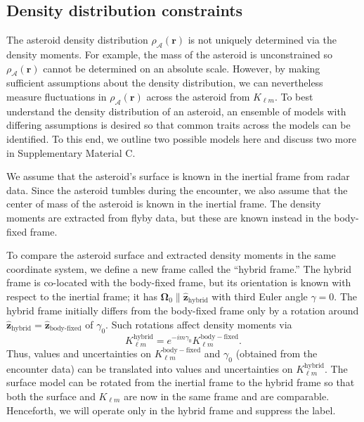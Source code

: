 \documentclass[fleqn,usenatbib]{mnras}
\newcommand{\unit}[1]{\bm{\hat{#1}}}
\begin{document}
\subsection{Density distribution constraints}
\label{sec:density-distro}

The asteroid density distribution $\rho_\mathcal{A}(\bm r)$ is not uniquely determined via the density moments. For example, the mass of the asteroid is unconstrained so $\rho_\mathcal{A}(\bm r)$ cannot be determined on an absolute scale. However, by making sufficient assumptions about the density distribution, we can nevertheless measure fluctuations in $\rho_\mathcal{A}(\bm r)$ across the asteroid from $K_{\ell m}$. To best understand the density distribution of an asteroid, an ensemble of models with differing assumptions is desired so that common traits across the models can be identified. To this end, we outline two possible models here and discuss two more in Supplementary Material C.

We assume that the asteroid's surface is known in the inertial frame from radar data. Since the asteroid tumbles during the encounter, we also assume that the center of mass of the asteroid is known in the inertial frame. The density moments are extracted from flyby data, but these are known instead in the body-fixed frame.

To compare the asteroid surface and extracted density moments in the same coordinate system, we define a new frame called the ``hybrid frame.'' The hybrid frame is co-located with the body-fixed frame, but its orientation is known with respect to the inertial frame; it has $\bm \Omega_0 \parallel \unit z_\text{hybrid}$ with third Euler angle $\gamma = 0$. The hybrid frame initially differs from the body-fixed frame only by a rotation around $\unit z_\text{hybrid}=\unit z_\text{body-fixed}$ of $\gamma_0$. Such rotations affect density moments via 
\begin{equation}
  K_{\ell m}^\mathrm{hybrid} = e^{-im\gamma_0}K_{\ell m}^\mathrm{body-fixed}.
  \label{eqn:body-fixed-to-hybrid}
\end{equation}
Thus, values and  uncertainties on $K_{\ell m}^\mathrm{body-fixed}$ and $\gamma_0$ (obtained from the encounter data) can be translated into values and uncertainties on $K_{\ell m}^\mathrm{hybrid}$. The surface model can be rotated from the inertial frame to the hybrid frame so that both the surface and $K_{\ell m}$ are now in the same frame and are comparable. Henceforth, we will operate only in the hybrid frame and suppress the label.
\end{document}
